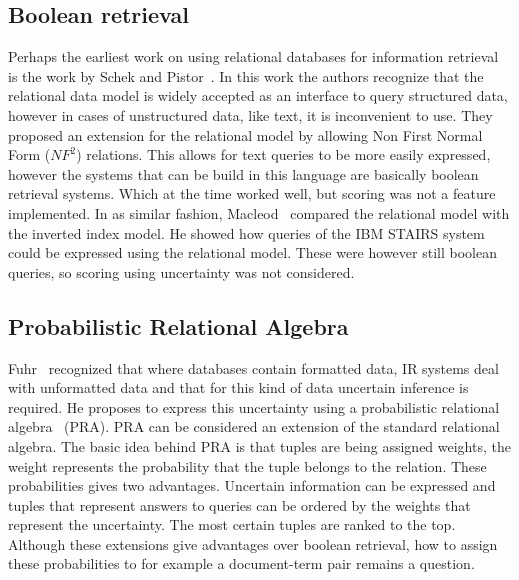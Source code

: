 \subsection{Boolean retrieval}
Perhaps the earliest work on using relational databases for information retrieval is the work by Schek and Pistor~\cite{SchekPistor}. In this work the authors recognize that the relational data model is widely accepted as an interface to query structured data, however in cases of unstructured data, like text, it is inconvenient to use. They proposed an extension for the relational model by allowing Non First Normal Form ($NF^2$) relations. This allows for text queries to be more easily expressed, however the systems that can be build in this language are basically boolean retrieval systems. Which at the time worked well, but scoring was not a feature implemented.  
In as similar fashion, Macleod~\cite{macleod} compared the relational model with the inverted index model. He showed how queries of the IBM STAIRS system could be expressed using the relational model. These were however still boolean queries, so scoring using uncertainty was not considered. 

\subsection{Probabilistic Relational Algebra}
Fuhr~\cite{fuhr1996probabilistic} recognized that where databases contain formatted data, IR systems deal with unformatted data and that for this kind of data uncertain inference is required. He proposes to express this uncertainty using a probabilistic relational algebra~\cite{fuhr-pra} (PRA). 
PRA can be considered an extension of the standard relational algebra. 
The basic idea behind PRA is that tuples are being assigned weights, the weight represents the probability that the tuple belongs to the relation. These probabilities gives two advantages. Uncertain information can be expressed and tuples that represent answers to queries can be ordered by the weights that represent the uncertainty. The most certain tuples are ranked to the top. Although these extensions give advantages over boolean retrieval, how to assign these probabilities to for example a document-term pair remains a question.

